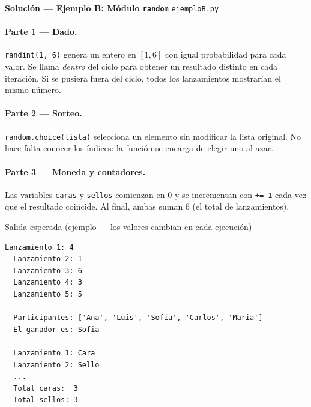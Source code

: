 \documentclass[12pt,a4paper]{article}
\begin{document}
\newpage
\begin{solucionbanner}
  {\large\bfseries\color{solColor} Solución — Ejemplo B: Módulo \texttt{random}}
  \hfill \texttt{ejemploB.py}
\end{solucionbanner}

\vspace{0.8em}


\vspace{0.8em}
\paragraph{Parte 1 — Dado.}
\texttt{randint(1, 6)} genera un entero en $[1, 6]$ con igual probabilidad para
cada valor.  Se llama \emph{dentro} del ciclo para obtener un resultado distinto
en cada iteración.  Si se pusiera fuera del ciclo, todos los lanzamientos
mostrarían el mismo número.

\paragraph{Parte 2 — Sorteo.}
\texttt{random.choice(lista)} selecciona un elemento sin modificar la lista original.
No hace falta conocer los índices: la función se encarga de elegir uno al azar.

\paragraph{Parte 3 — Moneda y contadores.}
Las variables \texttt{caras} y \texttt{sellos} comienzan en 0 y se incrementan
con \texttt{+= 1} cada vez que el resultado coincide.
Al final, ambas suman 6 (el total de lanzamientos).

\vspace{0.6em}
\begin{salidabox}{Salida esperada (ejemplo — los valores cambian en cada ejecución)}
\begin{lstlisting}[style=OutputStyle]
  Lanzamiento 1: 4
  Lanzamiento 2: 1
  Lanzamiento 3: 6
  Lanzamiento 4: 3
  Lanzamiento 5: 5

  Participantes: ['Ana', 'Luis', 'Sofia', 'Carlos', 'Maria']
  El ganador es: Sofia

  Lanzamiento 1: Cara
  Lanzamiento 2: Sello
  ...
  Total caras:  3
  Total sellos: 3
\end{lstlisting}
\end{salidabox}
\end{document}
